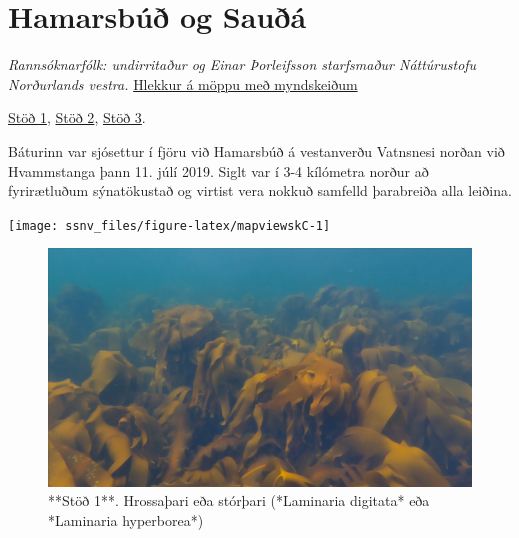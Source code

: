 \documentclass[icelandic,]{book}
\begin{document}
\hypertarget{hamarsbu-og-saua}{%
\chapter*{Hamarsbúð og Sauðá}\label{hamarsbu-og-saua}}

\emph{Rannsóknarfólk: undirritaður og Einar Þorleifsson starfsmaður Náttúrustofu Norðurlands vestra.} \href{https://www.dropbox.com/sh/rodn0wueqkjfz1i/AAALWpzgA0WOKZcknNURKd1Ia?dl=0}{Hlekkur á möppu með myndskeiðum}

\href{https://www.dropbox.com/s/esjsqxal7ehehof/Trident-Jul-11-125153-HQ.mp4?dl=0}{Stöð 1},
\href{https://www.dropbox.com/s/ytjy4sl1n0ozmjb/Trident-Jul-11-131216-HQ.mp4?dl=0}{Stöð 2},
\href{https://www.dropbox.com/s/5qn3lgbcrxlnc7y/Trident-Jul-11-135213-HQ.mp4?dl=0}{Stöð 3}.

Báturinn var sjósettur í fjöru við Hamarsbúð á vestanverðu Vatnsnesi norðan við Hvammstanga þann 11. júlí 2019. Siglt var í 3-4 kílómetra norður að fyrirætluðum sýnatökustað og virtist vera nokkuð samfelld þarabreiða alla leiðina.

\begin{center}\texttt{[image: ssnv\_files/figure-latex/mapviewskC-1]} \end{center}

\begin{figure}

{\centering \includegraphics[width=1\linewidth]{skjol/skogar/sk3/stodvar/st1/sk3-st1} 

}

\caption{**Stöð 1**. Hrossaþari eða stórþari (*Laminaria digitata* eða *Laminaria hyperborea*)}\label{fig:mynd-sk-thrju-stod-eitt}
\end{figure}
\end{document}
